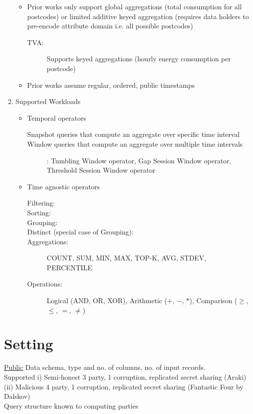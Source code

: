 \begin{enumerate}
\begin{itemize}
\begin{description}
        \end{description}
       \item Prior works only support global aggregations (total consumption for all postcodes) or limited additive keyed aggregation (requires data holders to pre-encode attribute domain i.e. all possible postcodes)
         \begin{description}
            \item[TVA:] Supports keyed aggregations (hourly energy consumption per postcode)
        \end{description}
       \item Prior works assume regular, ordered, public timestamps
    \end{itemize}
    \item Supported Workloads
    \begin{itemize}
       \item Temporal operators 
        \begin{description}
            \item[Snapshot queries that compute an aggregate over specific time interval]
            \item[Window queries that compute an aggregate over multiple time intervals]: Tumbling Window operator, Gap Session Window operator, Threshold Session Window operator
        \end{description}
       \item Time agnostic operators 
         \begin{description}
            \item[Filtering:] 
            \item[Sorting:] 
            \item[Grouping:] 
            \item[Distinct (special case of Grouping):] 
            \item[Aggregations:] COUNT, SUM, MIN, MAX, TOP-K, AVG, STDEV, PERCENTILE
            \item[Operations:] Logical (AND, OR, XOR), Arithmetic ($+$, $-$, $*$), Comparison ($\ge$, $\le$, $=$, $\neq$)
        \end{description}
    \end{itemize}
\end{enumerate}

\section{Setting}
\textbullet{} \underline{Public} Data schema, type and no. of columns, no. of input records. \\
\textbullet{} Supported i) Semi-honest 3 party, 1 corruption, replicated secret sharing (Araki) (ii) Malicious 4 party, 1 corruption, replicated secret sharing (Fantastic Four by Dalskov) \\
\textbullet{} Query structure known to computing parties  

